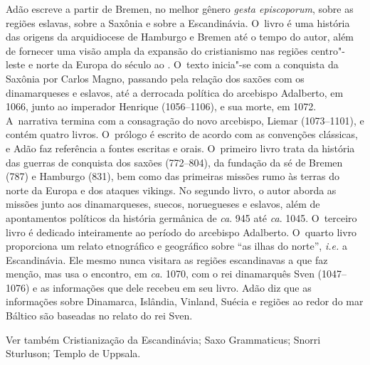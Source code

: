 Adão escreve a partir de Bremen, no melhor gênero \emph{gesta
episcoporum}, sobre as regiões eslavas, sobre a Saxônia e sobre a
Escandinávia. O~livro é uma história das origens da arquidiocese de
Hamburgo e Bremen até o tempo do autor, além de fornecer uma visão ampla
da expansão do cristianismo nas regiões centro"-leste e norte da Europa
do século  ao . O~texto inicia"-se com a conquista da Saxônia por
Carlos Magno, passando pela relação dos saxões com os dinamarqueses e
eslavos, até a derrocada política do arcebispo Adalberto, em 1066, junto
ao imperador Henrique  (1056--1106), e sua morte, em 1072. A~narrativa
termina com a consagração do novo arcebispo, Liemar (1073--1101), e
contém quatro livros. O~prólogo é escrito de acordo com as convenções
clássicas, e Adão faz referência a fontes escritas e orais. O~primeiro
livro trata da história das guerras de conquista dos saxões (772--804),
da fundação da sé de Bremen (787) e Hamburgo (831), bem como das
primeiras missões rumo às terras do norte da Europa e dos ataques
vikings. No segundo livro, o autor aborda as missões junto aos
dinamarqueses, suecos, noruegueses e eslavos, além de apontamentos
políticos da história germânica de \emph{ca}. 945 até \emph{ca}. 1045. O~terceiro 
livro é dedicado inteiramente ao período do arcebispo
Adalberto. O~quarto livro proporciona um relato etnográfico e geográfico
sobre ``as ilhas do norte'', \emph{i.e.} a Escandinávia. Ele mesmo nunca
visitara as regiões escandinavas a que faz menção, mas usa o encontro,
em \emph{ca}. 1070, com o rei dinamarquês Sven  (1047--1076) e as
informações que dele recebeu em seu livro. Adão diz que as informações
sobre Dinamarca, Islândia, Vinland, Suécia e regiões ao redor do mar
Báltico são baseadas no relato do rei Sven.

Ver também Cristianização da Escandinávia; Saxo Grammaticus; Snorri
Sturluson; Templo de Uppsala.



